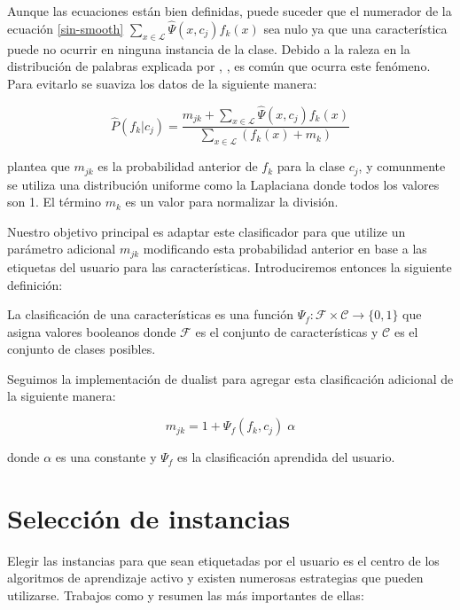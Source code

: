 Aunque las ecuaciones están bien definidas, puede suceder que el numerador de la ecuación \ref{sin-smooth} $\sum_{x \in \mathcal{L}} \hat{\Psi}(x, c_j) f_k(x)$ sea nulo ya que una característica puede no ocurrir en ninguna instancia de la clase. Debido a la raleza en la distribución de palabras explicada por \citet{zipf1}, \citet{zipf2}, es común que ocurra este fenómeno. Para evitarlo se suaviza los datos de la siguiente manera:

\begin{equation}
\hat{P}(f_k|c_j) = \frac{m_{jk} + \sum_{x \in \mathcal{L}} \hat{\Psi}(x, c_j) f_k(x)}{\sum_{x \in \mathcal{L}} (f_k(x) + m_k)}
\end{equation}

\citet{dualist} plantea que $m_{jk}$ es la probabilidad anterior de $f_k$ para la clase $c_j$, y comunmente se utiliza una distribución uniforme como la Laplaciana donde todos los valores son 1. El término $m_k$ es un valor para normalizar la división.

Nuestro objetivo principal es adaptar este clasificador para que utilize un parámetro adicional $m_{jk}$ modificando esta probabilidad anterior en base a las etiquetas del usuario para las características. Introduciremos entonces la siguiente definición:

\begin{definition}
La clasificación de una características es una función $\Psi_f:\mathcal{F} \times \mathcal{C} \rightarrow \{0, 1\}$ que asigna valores booleanos donde $\mathcal{F}$ es el conjunto de características y $\mathcal{C}$ es el conjunto de clases posibles.
\end{definition}

Seguimos la implementación de dualist para agregar esta clasificación adicional de la siguiente manera:

\begin{equation}
m_{jk} = 1 + \Psi_f(f_k, c_j) \; \alpha
\end{equation}

donde $\alpha$ es una constante y $\Psi_f$ es la clasificación aprendida del usuario.


\section{Selección de instancias}

Elegir las instancias para que sean etiquetadas por el usuario es el centro de los algoritmos de aprendizaje activo y existen numerosas estrategias que pueden utilizarse. Trabajos como \citet{settles_active_learning_survey} y \citet{al-logistic-regresion-schein} resumen las más importantes de ellas:

